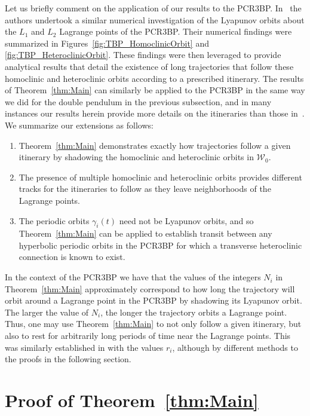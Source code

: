 \documentclass[11pt]{article}
\numberwithin{equation}{section}
\theoremstyle{plain}
\begin{document}
Let us briefly comment on the application of our results to the PCR3BP. In~\cite{Koon} the authors undertook a similar numerical investigation of the Lyapunov orbits about the $L_1$ and $L_2$ Lagrange points of the PCR3BP. Their numerical findings were summarized in Figures~\ref{fig:TBP_HomoclinicOrbit} and \ref{fig:TBP_HeteroclinicOrbit}. These findings were then leveraged to provide analytical results that detail the existence of long trajectories that follow these homoclinic and heteroclinic orbits according to a prescribed itinerary. The results of Theorem~\ref{thm:Main} can similarly be applied to the PCR3BP in the same way we did for the double pendulum in the previous subsection, and in many instances our results herein provide more details on the itineraries than those in~\cite{Koon}. We summarize our extensions as follows:
\begin{enumerate}
	\item Theorem~\ref{thm:Main} demonstrates exactly how trajectories follow a given itinerary by shadowing the homoclinic and heteroclinic orbits in $\mathcal{W}_0$.
	\item The presence of multiple homoclinic and heteroclinic orbits provides different tracks for the itineraries to follow as they leave neighborhoods of the Lagrange points. %
	\item The periodic orbits $\gamma_i(t)$ need not be Lyapunov orbits, and so Theorem~\ref{thm:Main} can be applied to establish transit between any hyperbolic periodic orbits in the PCR3BP for which a transverse heteroclinic connection is known to exist.
\end{enumerate}
In the context of the PCR3BP we have that the values of the integers $N_i$ in Theorem~\ref{thm:Main} approximately correspond to how long the trajectory will orbit around a Lagrange point in the PCR3BP by shadowing its Lyapunov orbit. The larger the value of $N_i$, the longer the trajectory orbits a Lagrange point. Thus, one may use Theorem~\ref{thm:Main} to not only follow a given itinerary, but also to rest for arbitrarily long periods of time near the Lagrange points. This was similarly established in \cite[Theorem~4.2]{Koon} with the values $r_i$, although by different methods to the proofs in the following section.






\section{Proof of Theorem~\ref{thm:Main}}\label{sec:Proofs} %
\end{document}
